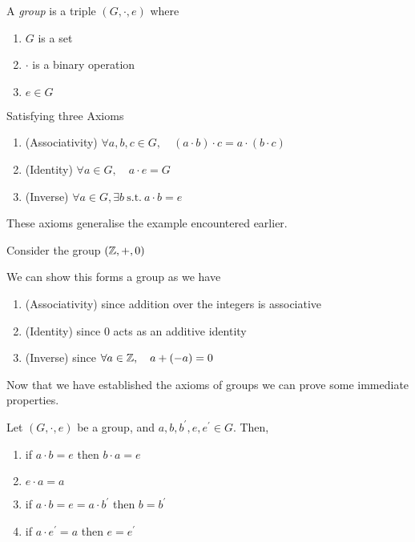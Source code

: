 \documentclass{article}
\begin{document}
\begin{defi}[Group]
    A \emph{group} is a triple $(G, \cdot, e)$ where
    \begin{enumerate}
        \item $G$ is a set
        \item $\cdot$ is a binary operation
        \item $e \in G$
    \end{enumerate}

    Satisfying three Axioms
    \begin{enumerate}
        \item (Associativity) $\forall a, b, c \in G, \quad (a \cdot b) \cdot c = a \cdot (b \cdot c)$
        \item (Identity) $\forall a \in G, \quad a \cdot e = G$
        \item (Inverse) $\forall a \in G, \exists b \ \text{s.t.} \ a \cdot b = e$
    \end{enumerate}
\end{defi}

These axioms generalise the example encountered earlier.
\begin{eg}
    Consider the group $(\mathbb{Z}, +, 0)$

    We can show this forms a group as we have
    \begin{enumerate}
        \item (Associativity) since addition over the integers is associative
        \item (Identity) since $0$ acts as an additive identity
        \item (Inverse) since $\forall a \in \mathbb{Z}, \quad a + (-a) = 0$
    \end{enumerate}
\end{eg}
Now that we have established the axioms of groups we can prove some immediate properties.

\begin{prop}
    Let $(G, \cdot, e)$ be a group, and $a, b, b^{\prime}, e, e^{\prime} \in G$. Then,
    \begin{enumerate}
        \item if $a \cdot b = e$ then $b \cdot a = e$
        \item $e \cdot a = a$
        \item if $a \cdot b = e = a \cdot b^{\prime}$ then $b = b^{\prime}$
        \item if $a \cdot e^{\prime} = a$ then $e = e^{\prime}$
    \end{enumerate}
\end{prop}
\end{document}
